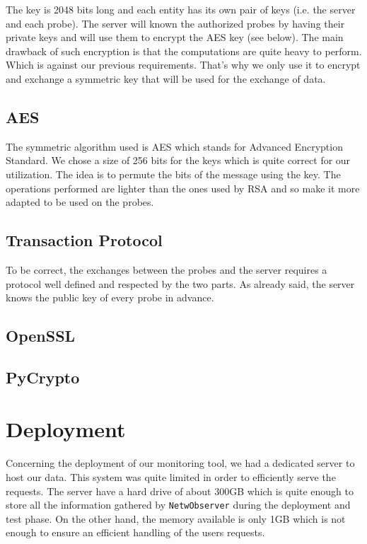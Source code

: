 The key is 2048 bits long and each entity has its own pair of keys (i.e. the server and each probe). The server will known the authorized probes by having their private keys and will use them to encrypt the AES key (see below).
The main drawback of such encryption is that the computations are quite heavy to perform. Which is against our previous requirements. That's why we only use it to encrypt and exchange a symmetric key that will be used for the exchange of data.

\subsection{AES}
The symmetric algorithm used is AES which stands for Advanced Encryption Standard. We chose a size of 256 bits for the keys which is quite correct for our utilization. The idea is to permute the bits of the message using the key. The operations performed are lighter than the ones used by RSA and so make it more adapted to be used on the probes.


\subsection{Transaction Protocol}
To be correct, the exchanges between the probes and the server requires a protocol well defined and respected by the two parts. As already said, the server knows the public key of every probe in advance. 

\subsection{OpenSSL}

\subsection{PyCrypto}

\section{Deployment}
Concerning the deployment of our monitoring tool, we had a dedicated server to host our data. This system was quite limited in order to efficiently serve the requests. The server have a hard drive of about 300GB which is quite enough to store all the information gathered by \texttt{NetwObserver} during the deployment and test phase. On the other hand, the memory available is only 1GB which is not enough to ensure an efficient handling of the users requests.

